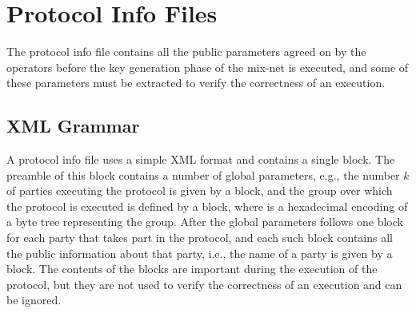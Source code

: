 \documentclass[11pt]{article}
\begin{document}




\section{Protocol Info Files}\label{sect:infofiles}

The protocol info file contains all the public parameters agreed on by
the operators before the key generation phase of the mix-net is
executed, and some of these parameters must be extracted to verify the
correctness of an execution.

\subsection{XML Grammar}\label{sect:xmlgrammar}

A protocol info file uses a simple XML format and contains a single
 block. The preamble of this block contains
a number of global parameters, e.g., the number $k$ of parties
executing the protocol is given by a  block,
and the group over which the protocol is executed is defined by a
 block, where  is a
hexadecimal encoding of a byte tree representing the group. After the
global parameters follows one  block for each
party that takes part in the protocol, and each such block contains
all the public information about that party, i.e., the name of a party
is given by a  block. The contents of the
 blocks are important during the execution of the
protocol, but they are not used to verify the correctness of an
execution and can be ignored.
\end{document}
